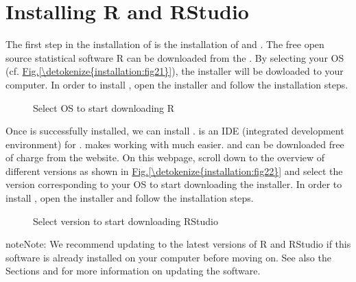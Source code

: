 \documentclass[letterpaper,10pt,english]{sphinxmanual}
\begin{document}
\section{Installing R and RStudio}
\label{\detokenize{installation:installing-r-and-rstudio}}
The first step in the installation of  is the installation of  and . The
free open source statistical software R can be downloaded from the .
By selecting your OS (cf. \hyperref[\detokenize{installation:fig21}]{Fig.\@ \ref{\detokenize{installation:fig21}}}), the installer will be dowloaded to your computer. In order to install
, open the installer and follow the installation steps.

\begin{figure}[htbp]
\centering
\capstart

\noindent{}
\caption{Select OS to start downloading R}\label{\detokenize{installation:fig21}}\label{\detokenize{installation:id10}}\end{figure}

Once  is successfully installed, we can install .  is an IDE
(integrated development environment) for .
 makes working with  much easier.  and  can be downloaded
free of charge from the  website.
On this webpage, scroll down to the overview of different versions as shown in \hyperref[\detokenize{installation:fig22}]{Fig.\@ \ref{\detokenize{installation:fig22}}}
and select the version corresponding to your OS to start downloading the installer.
In order to install , open the installer and follow the installation steps.

\begin{figure}[htbp]
\centering
\capstart

\noindent{}
\caption{Select version to start downloading RStudio}\label{\detokenize{installation:fig22}}\label{\detokenize{installation:id11}}\end{figure}

\begin{sphinxadmonition}{note}{Note:}
We recommend updating to the latest versions of R and RStudio if this software is already
installed on your computer before moving on.
See also the Sections {\hyperref[\detokenize{installation:updating-r}]{}} and {\hyperref[\detokenize{installation:updating-rstudio}]{}} for more information on updating the software.
\end{sphinxadmonition}
\end{document}
